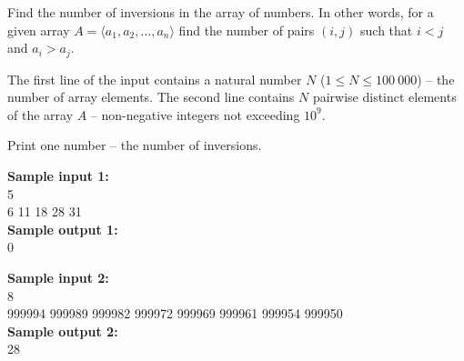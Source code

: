\documentclass[a4paper]{article}
\begin{document}
Find the number of inversions in the array of numbers. In other words, for a given array $A = \langle a_1, a_2, \dots, a_n \rangle$ find the number of pairs $(i, j)$ such that $i < j$ and $a_i > a_j$.

The first line of the input contains a natural number $N$ ($1 \le N \le 100 \ 000$) -- the number of array elements. The second line contains $N$ pairwise distinct elements of the array $A$ -- non-negative integers not exceeding $10^9$.

Print one number -- the number of inversions.

\LINE

\noindent \textbf{Sample input 1:}\\
5\\
6 11 18 28 31\\


\noindent \textbf{Sample output 1:}\\
0

\SPACE

\noindent \textbf{Sample input 2:}\\
8\\
999994 999989 999982 999972 999969 999961 999954 999950\\


\noindent \textbf{Sample output 2:}\\
28
\end{document}
